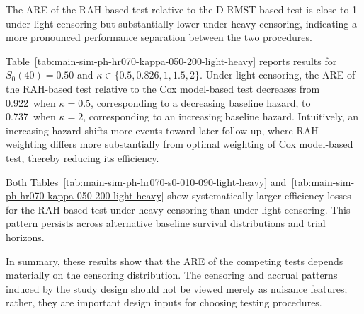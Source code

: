\documentclass[12pt]{article}
\newcommand{\AreRahCoxPHShapeHalf}{0.922}
\newcommand{\AreRahCoxPHShapeTwo}{0.737}
\begin{document}
The ARE of the RAH-based test relative to the D-RMST-based test is close to 1 under light censoring but substantially lower under heavy censoring, indicating a more pronounced performance separation between the two procedures.



Table~\ref{tab:main-sim-ph-hr070-kappa-050-200-light-heavy} reports results for \(S_0(40)=0.50\) and \(\kappa\in\{0.5,0.826,1,1.5,2\}\). Under light censoring, the ARE of the RAH-based test relative to the Cox model-based test decreases from \AreRahCoxPHShapeHalf\ when \(\kappa=0.5\), corresponding to a decreasing baseline hazard, to \AreRahCoxPHShapeTwo\ when \(\kappa=2\), corresponding to an increasing baseline hazard. Intuitively, an increasing hazard shifts more events toward later follow-up, where RAH weighting differs more substantially from optimal weighting of Cox model-based test, thereby reducing its efficiency.

Both Tables~\ref{tab:main-sim-ph-hr070-s0-010-090-light-heavy} and~\ref{tab:main-sim-ph-hr070-kappa-050-200-light-heavy} show systematically larger efficiency losses for the RAH-based test under heavy censoring than under light censoring. This pattern persists across alternative baseline survival distributions and trial horizons.

In summary, these results show that the ARE of the competing tests depends materially on the censoring distribution. The censoring and accrual patterns induced by the study design should not be viewed merely as nuisance features; rather, they are important design inputs for choosing testing procedures.
\end{document}
